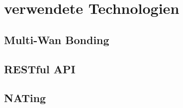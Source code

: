 \chapter{verwendete Technologien}
\label{chap:verwendeteTechnologien}
\section{Multi-Wan Bonding}
\section{RESTful API}
\section{NATing}